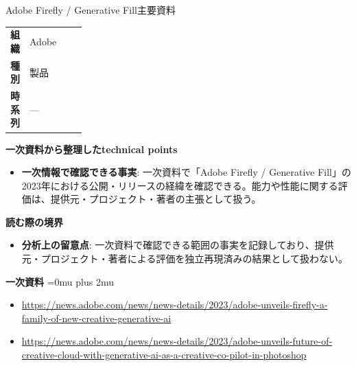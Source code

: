 \begin{technicalnote}{Adobe Firefly / Generative Fill}{主要資料}
\begingroup
\begin{tabularx}{\linewidth}{@{}>{\bfseries}p{0.22\linewidth}X@{}}
組織 & Adobe \\
種別 & 製品 \\
時系列 & — \\
\end{tabularx}
\smallskip
{\bfseries 一次資料から整理したtechnical points}
\begin{itemize}[leftmargin=1.5em,itemsep=0.35em]
\item \textbf{一次情報で確認できる事実}: 一次資料で「Adobe Firefly / Generative Fill」の2023年における公開・リリースの経緯を確認できる。能力や性能に関する評価は、提供元・プロジェクト・著者の主張として扱う。
\end{itemize}
\begin{minipage}{\linewidth}
{\bfseries 読む際の境界}
\begin{itemize}[leftmargin=1.5em,itemsep=0.35em]
\item \textbf{分析上の留意点}: 一次資料で確認できる範囲の事実を記録しており、提供元・プロジェクト・著者による評価を独立再現済みの結果として扱わない。
\end{itemize}
\begin{samepage}
{\bfseries 一次資料}
\begingroup\sloppy
\Urlmuskip=0mu plus 2mu\relax
\begin{itemize}[leftmargin=1.5em,itemsep=0.25em]
\item {\scriptsize\url{https://news.adobe.com/news/news-details/2023/adobe-unveils-firefly-a-family-of-new-creative-generative-ai}}
\item {\scriptsize\url{https://news.adobe.com/news/news-details/2023/adobe-unveils-future-of-creative-cloud-with-generative-ai-as-a-creative-co-pilot-in-photoshop}}
\end{itemize}
\endgroup
\end{samepage}
\end{minipage}
\endgroup
\end{technicalnote}
\medskip

